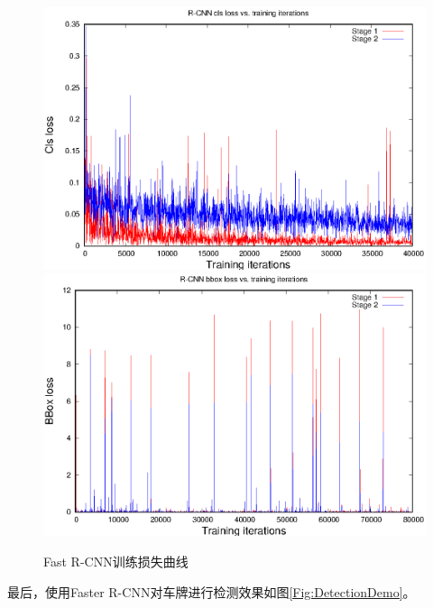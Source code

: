 \begin{figure}[ht]
\centering
{}
{\includegraphics[width=1.0\linewidth]{./Figure/RCNNClsLoss.eps}}
{\includegraphics[width=1.0\linewidth]{./Figure/RCNNBBoxLoss.eps}}
\caption{Fast R-CNN训练损失曲线}\label{Fig:RCNNloss}
\end{figure}

最后，使用Faster R-CNN对车牌进行检测效果如图\ref{Fig:DetectionDemo}。

